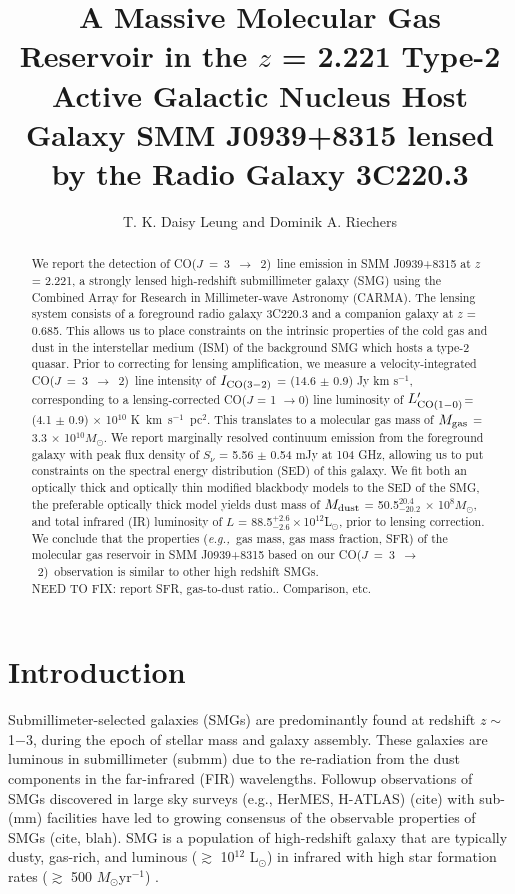 \documentclass[twocolumn,apj,numberedappendix]{emulateapj}
\newcommand{\Msun}{\mbox{$M_{\odot}$}}
\newcommand{\Lsun}{\mbox{L$_{\odot}$}}
\newcommand{\rarr}{$\rightarrow$}
\newcommand{\CO}{\mbox{CO($J$ = 3 $\rightarrow$ 2) }}
\newcommand{\Lp}{\mbox{$L^{\prime}_{\rm CO(1-0)}$}}
\newcommand{\LpU}{\mbox{K km s$^{-1}$ pc$^2$}}
\newcommand{\eg}{{\sl e.g.,~}}
\newcommand{\pmOne}{$^{-1}$}
\begin{document}
\title{A Massive Molecular Gas Reservoir in the $z$ = 2.221 Type-2 Active Galactic Nucleus Host Galaxy SMM J0939+8315 lensed by the Radio Galaxy 3C220.3}
\author{T. K. Daisy Leung and Dominik A. Riechers}

\begin{abstract}
We report the detection of \CO line emission in SMM J0939+8315 at $z$ = 2.221, a
strongly lensed high-redshift submillimeter galaxy (SMG) using
the Combined Array for Research in Millimeter-wave Astronomy (CARMA). The lensing system consists of a
foreground radio galaxy 3C220.3 and a companion galaxy at $z$ = 0.685. This allows us to place constraints on the intrinsic properties
of the cold gas and dust in the interstellar medium (ISM) of the background SMG which hosts a type-2 quasar. Prior to correcting for lensing 
amplification, we measure a velocity-integrated \CO line intensity of $I_{\rm CO(3-2)}$ = (14.6 $\pm$ 0.9) Jy km s\pmOne,
corresponding to a lensing-corrected CO($J$ = 1 \rarr 0) line luminosity of \Lp = (4.1 $\pm$ 
0.9) $\times$ 10$^{10}$ \LpU. This
translates to a molecular gas mass of $M_{\rm gas}$ = 3.3 $\times$ 10$^{10}M_\odot$. We report marginally resolved continuum 
emission from the foreground galaxy with peak flux density of $S_\nu$ = 5.56 $\pm$ 0.54 mJy
 at 104 GHz, allowing us to put constraints on the spectral energy distribution (SED) of this galaxy. We 
fit
 both an optically thick and optically thin modified blackbody models to the SED of the SMG, the preferable optically thick model  yields dust mass of $M_{\rm
dust}$ = 50.5$^{20.4}_{-20.2}$ $\times$ 10$^8$\Msun, and total infrared (IR) luminosity of $L$ = 88.5$^{+2.6}
_{-2.6}\times$10$^{12}$\Lsun, prior to lensing correction. We conclude that the properties (\eg gas mass, gas mass 
fraction, SFR) of the molecular gas reservoir in SMM
J0939+8315 based on our \CO observation is similar to other high redshift
SMGs. \\
NEED TO  FIX: 
report SFR, gas-to-dust ratio.. Comparison, etc. 
\end{abstract}

\section{Introduction}\label{sec:intro}
Submillimeter-selected galaxies (SMGs) are predominantly found at redshift $z \sim$ 1$-$3, during the epoch of stellar mass and 
galaxy assembly. These galaxies are luminous in submillimeter (submm) due to the re-radiation from the dust components in the
 far-infrared (FIR) wavelengths. Followup observations of SMGs discovered in large sky surveys (e.g., HerMES, H-ATLAS) (cite) with sub-(mm) facilities have led to growing consensus
  of the observable properties of SMGs (cite, blah). SMG is a population of high-redshift galaxy that are typically dusty, gas-rich, 
  and luminous ($\gtrsim$ 10$^{12}$ \Lsun) in infrared with high star formation rates ($\gtrsim $ 500 \Msun yr\pmOne) \citep[\eg][]{Lagache05a}.
  
\end{document}
